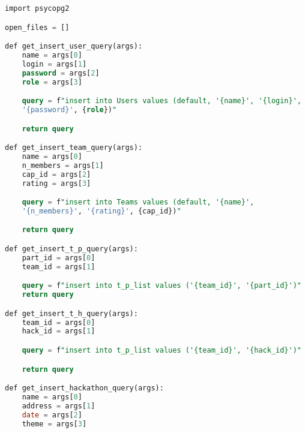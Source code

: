 \captionsetup{singlelinecheck=false, justification=raggedright}
\begin{lstlisting}[language=sql, caption=Заполнение базы данных, label=fill]
import psycopg2

open_files = []

def get_insert_user_query(args):
    name = args[0]
    login = args[1]
    password = args[2]
    role = args[3]

    query = f"insert into Users values (default, '{name}', '{login}',
    '{password}', {role})"

    return query

def get_insert_team_query(args):
    name = args[0]
    n_members = args[1]
    cap_id = args[2]
    rating = args[3]

    query = f"insert into Teams values (default, '{name}',
    '{n_members}', '{rating}', {cap_id})"

    return query

def get_insert_t_p_query(args):
    part_id = args[0]
    team_id = args[1]

    query = f"insert into t_p_list values ('{team_id}', '{part_id}')"
    return query

def get_insert_t_h_query(args):
    team_id = args[0]
    hack_id = args[1]

    query = f"insert into t_p_list values ('{team_id}', '{hack_id}')"

    return query

def get_insert_hackathon_query(args):
    name = args[0]
    address = args[1]
    date = args[2]
    theme = args[3]
\end{lstlisting}


